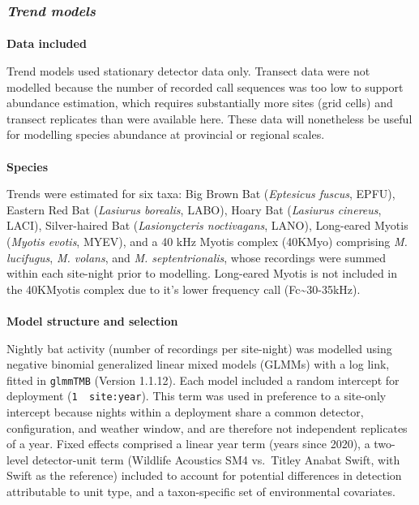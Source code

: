 \documentclass[
  letterpaper,
  DIV=11,
  numbers=noendperiod]{scrartcl}
\makeatletter
\let\oldparagraph\paragraph
\renewcommand{\paragraph}{
    \@ifstar
      \xxxParagraphStar
      \xxxParagraphNoStar
  }
\newcommand{\xxxParagraphStar}[1]{\oldparagraph*{#1}\mbox{}}
\newcommand{\xxxParagraphNoStar}[1]{\oldparagraph{#1}\mbox{}}
\newcounter{none} %
\makeatother
\begin{document}
\subsubsection{\texorpdfstring{\emph{Trend
models}}{Trend models}}\label{trend-models}

\paragraph{\texorpdfstring{\textbf{Data
included}}{Data included}}\label{data-included}

Trend models used stationary detector data only. Transect data were not
modelled because the number of recorded call sequences was too low to
support abundance estimation, which requires substantially more sites
(grid cells) and transect replicates than were available here. These
data will nonetheless be useful for modelling species abundance at
provincial or regional scales.

\paragraph{\texorpdfstring{\textbf{Species}}{Species}}\label{species}

Trends were estimated for six taxa: Big Brown Bat (\emph{Eptesicus
fuscus}, EPFU), Eastern Red Bat (\emph{Lasiurus borealis}, LABO), Hoary
Bat (\emph{Lasiurus cinereus}, LACI), Silver-haired Bat
(\emph{Lasionycteris noctivagans}, LANO), Long-eared Myotis
(\emph{Myotis evotis}, MYEV), and a 40 kHz Myotis complex (40KMyo)
comprising \emph{M. lucifugus}, \emph{M. volans}, and \emph{M.
septentrionalis}, whose recordings were summed within each site-night
prior to modelling. Long-eared Myotis is not included in the 40KMyotis
complex due to it's lower frequency call (Fc\textasciitilde30-35kHz).

\paragraph{\texorpdfstring{\textbf{Model structure and
selection}}{Model structure and selection}}\label{model-structure-and-selection}

Nightly bat activity (number of recordings per site-night) was modelled
using negative binomial generalized linear mixed models (GLMMs) with a
log link, fitted in \texttt{glmmTMB} (Version 1.1.12). Each model
included a random intercept for deployment
(\texttt{1\ \textbar{}\ site:year}). This term was used in preference to
a site-only intercept because nights within a deployment share a common
detector, configuration, and weather window, and are therefore not
independent replicates of a year. Fixed effects comprised a linear year
term (years since 2020), a two-level detector-unit term (Wildlife
Acoustics SM4 vs.~Titley Anabat Swift, with Swift as the reference)
included to account for potential differences in detection attributable
to unit type, and a taxon-specific set of environmental covariates.
\end{document}
